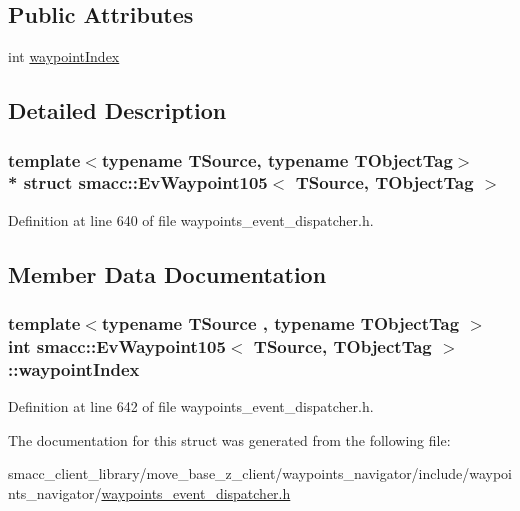 \subsection*{Public Attributes}
\begin{DoxyCompactItemize}
\item 
int \hyperlink{structsmacc_1_1EvWaypoint105_a860f2866663d58468667b085af6b7701}{waypoint\+Index}
\end{DoxyCompactItemize}


\subsection{Detailed Description}
\subsubsection*{template$<$typename T\+Source, typename T\+Object\+Tag$>$\\*
struct smacc\+::\+Ev\+Waypoint105$<$ T\+Source, T\+Object\+Tag $>$}



Definition at line 640 of file waypoints\+\_\+event\+\_\+dispatcher.\+h.



\subsection{Member Data Documentation}
\subsubsection[{\texorpdfstring{waypoint\+Index}{waypointIndex}}]{\setlength{\rightskip}{0pt plus 5cm}template$<$typename T\+Source , typename T\+Object\+Tag $>$ int {\bf smacc\+::\+Ev\+Waypoint105}$<$ T\+Source, T\+Object\+Tag $>$\+::waypoint\+Index}\hypertarget{structsmacc_1_1EvWaypoint105_a860f2866663d58468667b085af6b7701}{}\label{structsmacc_1_1EvWaypoint105_a860f2866663d58468667b085af6b7701}


Definition at line 642 of file waypoints\+\_\+event\+\_\+dispatcher.\+h.



The documentation for this struct was generated from the following file\+:\begin{DoxyCompactItemize}
\item 
smacc\+\_\+client\+\_\+library/move\+\_\+base\+\_\+z\+\_\+client/waypoints\+\_\+navigator/include/waypoints\+\_\+navigator/\hyperlink{waypoints__event__dispatcher_8h}{waypoints\+\_\+event\+\_\+dispatcher.\+h}\end{DoxyCompactItemize}

